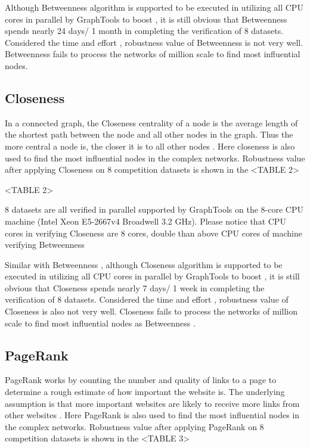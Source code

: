 \documentclass{article}
\begin{document}
	Although Betweenness algorithm is supported to be executed in utilizing all CPU cores in parallel by GraphTools \cite{peixotographtool2014} to boost , it is still obvious that Betweenness spends nearly 24 days/ 1 month in completing the verification of 8 datasets. Considered the time and effort , robustness value of Betweenness is not very well. Betweenness fails to process the networks of million scale to find most influential nodes.
	
	\subsection{Closeness}	
	
	
	In a connected graph, the Closeness centrality of a node is the average length of the shortest path between the node and all other nodes in the graph. Thus the more central a node is, the closer it is to all other nodes \cite{wikiClosenesscentrality}\cite{bavelas1950communication} . Here closeness is also used to find the most influential nodes in the complex networks. Robustness value after applying Closeness on 8 competition datasets is shown in the <TABLE 2>
	
	<TABLE 2>
	
	8 datasets are all verified in parallel supported by GraphTools \cite{peixotographtool2014} on the 8-core CPU machine (Intel Xeon E5-2667v4 Broadwell 3.2 GHz). Please notice that CPU cores in verifying Closeness are 8 cores, double than above CPU cores of machine verifying Betweenness
	
	Similar with Betweenness , although Closeness algorithm is supported to be executed in utilizing all CPU cores in parallel by GraphTools to boost , it is still obvious that Closeness spends nearly 7 days/ 1 week in completing the verification of 8 datasets. Considered the time and effort , robustness value of Closeness is also not very well. Closeness fails to process the networks of million scale to find most influential nodes as Betweenness .
	
	
	\subsection{PageRank}	
	
	
	PageRank works by counting the number and quality of links to a page to determine a rough estimate of how important the website is. The underlying assumption is that more important websites are likely to receive more links from other websites \cite{wikiPageRank}\cite{page1999pagerank}. Here PageRank is also used to find the most influential nodes in the complex networks. Robustness value after applying PageRank on 8 competition datasets is shown in the <TABLE 3>
	
\end{document}

